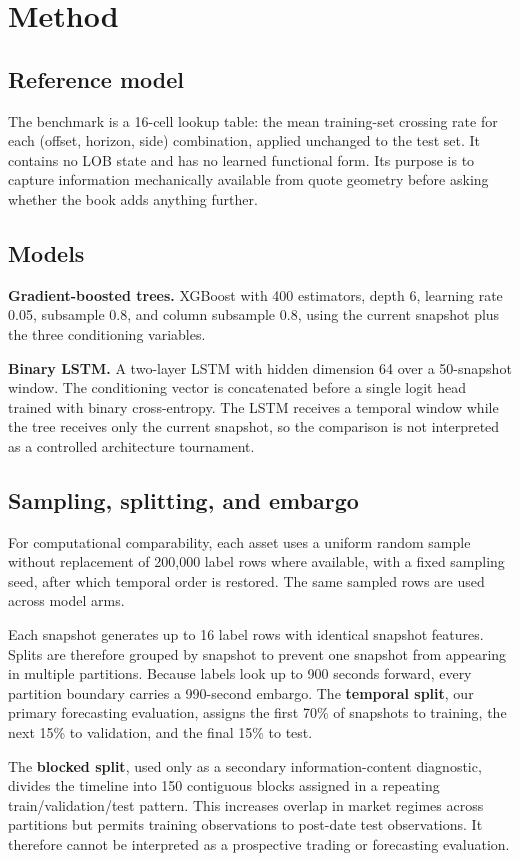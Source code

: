 \documentclass[11pt]{article}
\begin{document}
\section{Method}
\subsection{Reference model}
The benchmark is a 16-cell lookup table: the mean training-set crossing rate for each (offset, horizon, side) combination, applied unchanged to the test set. It contains no LOB state and has no learned functional form. Its purpose is to capture information mechanically available from quote geometry before asking whether the book adds anything further.

\subsection{Models}
\textbf{Gradient-boosted trees.} XGBoost with 400 estimators, depth 6, learning rate 0.05, subsample 0.8, and column subsample 0.8, using the current snapshot plus the three conditioning variables.

\textbf{Binary LSTM.} A two-layer LSTM with hidden dimension 64 over a 50-snapshot window. The conditioning vector is concatenated before a single logit head trained with binary cross-entropy. The LSTM receives a temporal window while the tree receives only the current snapshot, so the comparison is not interpreted as a controlled architecture tournament.

\subsection{Sampling, splitting, and embargo}
For computational comparability, each asset uses a uniform random sample without replacement of 200,000 label rows where available, with a fixed sampling seed, after which temporal order is restored. The same sampled rows are used across model arms.

Each snapshot generates up to 16 label rows with identical snapshot features. Splits are therefore grouped by snapshot to prevent one snapshot from appearing in multiple partitions. Because labels look up to 900 seconds forward, every partition boundary carries a 990-second embargo. The \textbf{temporal split}, our primary forecasting evaluation, assigns the first 70\% of snapshots to training, the next 15\% to validation, and the final 15\% to test.

The \textbf{blocked split}, used only as a secondary information-content diagnostic, divides the timeline into 150 contiguous blocks assigned in a repeating train/validation/test pattern. This increases overlap in market regimes across partitions but permits training observations to post-date test observations. It therefore cannot be interpreted as a prospective trading or forecasting evaluation.
\end{document}

